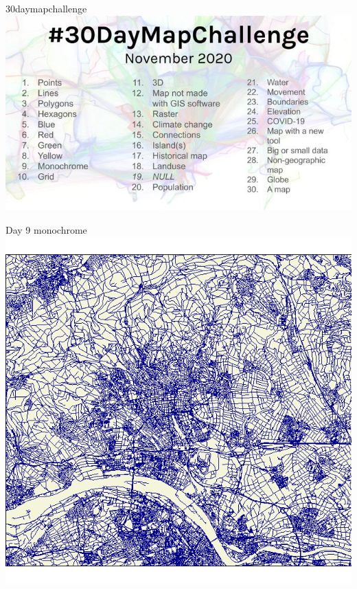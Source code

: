 \documentclass[
  ignorenonframetext,
]{beamer}
\begin{document}
\begin{frame}{30daymapchallenge}
\protect\hypertarget{daymapchallenge}{}
\includegraphics{pics/30daymapchallenge_copy_1jpg}
\end{frame}

\begin{frame}{Day 9 monochrome}
\protect\hypertarget{day-9-monochrome}{}
\includegraphics{pics/trier_monochrome.png}
\end{frame}
\end{document}
